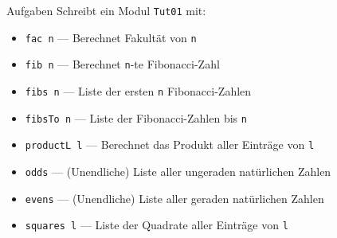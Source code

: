 \documentclass{beamer}
\begin{document}
\begin{frame}{Aufgaben}
	Schreibt ein Modul \texttt{Tut01} mit:

	\begin{itemize}
		\item \texttt{fac n} --- Berechnet Fakultät von \texttt{n}
		\item \texttt{fib n} --- Berechnet \texttt{n}-te Fibonacci-Zahl
		\item \texttt{fibs n} --- Liste der ersten \texttt{n} Fibonacci-Zahlen
		\item \texttt{fibsTo n} --- Liste der Fibonacci-Zahlen bis \texttt{n}
		\item \texttt{productL l} --- Berechnet das Produkt aller Einträge von \texttt{l}
		\item \texttt{odds} --- (Unendliche) Liste aller ungeraden natürlichen Zahlen
		\item \texttt{evens} --- (Unendliche) Liste aller geraden natürlichen Zahlen
		\item \texttt{squares l} --- Liste der Quadrate aller Einträge von \texttt{l}
	\end{itemize}
\end{frame}
\end{document}
